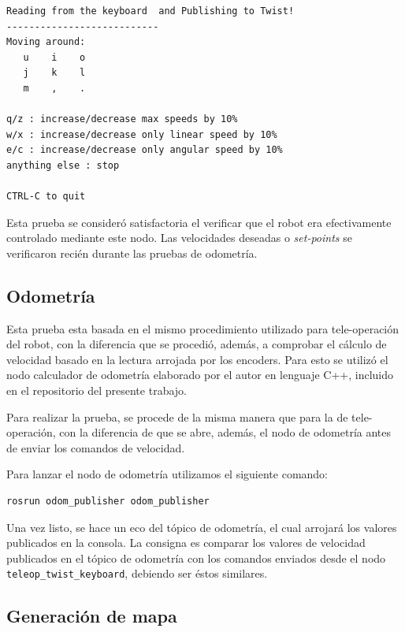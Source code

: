\begin{lstlisting}[basicstyle=\ttfamily, keywords={}]
Reading from the keyboard  and Publishing to Twist!
---------------------------
Moving around:
   u    i    o
   j    k    l
   m    ,    .

q/z : increase/decrease max speeds by 10%
w/x : increase/decrease only linear speed by 10%
e/c : increase/decrease only angular speed by 10%
anything else : stop

CTRL-C to quit
\end{lstlisting}

Esta prueba se consideró satisfactoria el verificar que el robot era efectivamente controlado mediante este nodo. Las velocidades deseadas o \textit{set-points} se verificaron recién durante las pruebas de odometría.


\subsection{Odometría}

Esta prueba esta basada en el mismo procedimiento utilizado para tele-operación del robot, con la diferencia que se procedió, además, a comprobar el cálculo de velocidad basado en la lectura arrojada por los encoders. Para esto se utilizó el nodo calculador de odometría elaborado por el autor en lenguaje C++, incluido en el repositorio del presente trabajo.

Para realizar la prueba, se procede de la misma manera que para la de tele-operación, con la diferencia de que se abre, además, el nodo de odometría antes de enviar los comandos de velocidad.

Para lanzar el nodo de odometría utilizamos el siguiente comando:

\begin{lstlisting}[basicstyle=\ttfamily, keywords={}]
rosrun odom_publisher odom_publisher
\end{lstlisting}

Una vez listo, se hace un eco del tópico de odometría, el cual arrojará los valores publicados en la consola. La consigna es comparar los valores de velocidad publicados en el tópico de odometría con los comandos enviados desde el nodo \texttt{teleop\_twist\_keyboard}, debiendo ser éstos similares.

\subsection{Generación de mapa}


